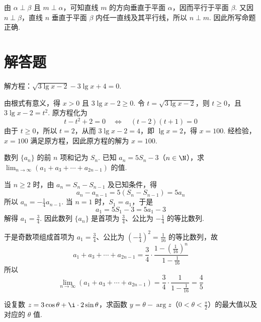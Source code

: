 \documentclass[UTF8,a4paper,oneside,11pt]{ctexbook}
\begin{document}
\begin{solution}
由 \(\alpha\perp\beta\) 且 \(m\perp\alpha\)，可知直线 \(m\) 的方向垂直于平面 \(\alpha\)，因而平行于平面 \(\beta\). 又因 \(n\perp\beta\)，直线 \(n\) 垂直于平面 \(\beta\) 内任一直线及其平行线，所以 \(n\perp m\). 因此所写命题正确.
\end{solution}

\section{解答题}

\begin{problem}
解方程：\(\sqrt{3\lg x-2}-3\lg x+4=0\).
\end{problem}

\begin{solution}
由根式有意义，得 \(x>0\) 且 \(3\lg x-2\geqslant0\). 令 \(t=\sqrt{3\lg x-2}\)，则 \(t\geqslant0\)，且 \(3\lg x-2=t^2\). 原方程化为
\[
t-t^2+2=0\quad\Longleftrightarrow\quad (t-2)(t+1)=0
\]
由于 \(t\geqslant0\)，所以 \(t=2\)，从而 \(3\lg x-2=4\)，即 \(\lg x=2\)，得 \(x=100\). 经检验，\(x=100\) 满足原方程，因此原方程的解为 \(x=100\).
\end{solution}

\begin{problem}
数列 \(\{a_{n}\}\) 的前 \(n\) 项和记为 \(S_{n}\). 已知 \(a_{n} = 5S_{n} - 3\)（\(n \in \N\)），求 \(\displaystyle\lim_{n \to \infty}(a_{1} + a_{3} + \cdots + a_{2n-1})\) 的值.
\end{problem}

\begin{solution}
当 \(n\geqslant2\) 时，由 \(a_n=S_n-S_{n-1}\) 及已知条件，得
\[
a_n-a_{n-1}=5(S_n-S_{n-1})=5a_n
\]
所以 \(a_n=-\frac14a_{n-1}\). 当 \(n=1\) 时，\(S_1=a_1\)，于是
\[
a_1=5S_1-3=5a_1-3
\]
解得 \(a_1=\frac34\). 因此数列 \(\{a_n\}\) 是首项为 \(\frac34\)、公比为 \(-\frac14\) 的等比数列.

于是奇数项组成首项为 \(a_1=\frac34\)、公比为 \(\left(-\frac14\right)^2=\frac1{16}\) 的等比数列，故
\[
a_1+a_3+\cdots+a_{2n-1}=\frac34\cdot\frac{1-\left(\frac1{16}\right)^n}{1-\frac1{16}}
\]
所以
\[
\lim_{n\to\infty}(a_1+a_3+\cdots+a_{2n-1})
=\frac34\cdot\frac1{1-\frac1{16}}=\frac45
\]
\end{solution}

\begin{problem}
设复数 \(z=3\cos\theta+\i\cdot 2\sin\theta\)，求函数 \(y=\theta-\arg z\)（\(0<\theta<\frac{\pi}{2}\)）的最大值以及对应的 \(\theta\) 值.
\end{problem}
\end{document}
